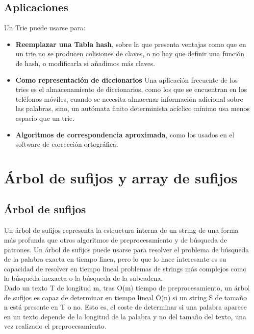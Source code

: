 \documentclass[es]{ifirak}
\begin{document}
\subsection{Aplicaciones}
\large{
Un Trie puede usarse para:

\begin{itemize}

	\item \textbf{Reemplazar una Tabla hash}, sobre la que presenta ventajas como que en un trie no se producen colisiones de claves, o no hay que definir una función de hash, o modificarla si añadimos más claves.
	\item \textbf{Como representación de diccionarios} Una aplicación frecuente de los tries es el almacenamiento de diccionarios, como los que se encuentran en los teléfonos móviles, cuando se necesita almacenar información adicional sobre las palabras, sino, un autómata finito determinista acíclico mínimo usa menos espacio que un trie.
	\item \textbf{Algoritmos de correspondencia aproximada}, como los usados en el software de corrección ortográfica.
\end{itemize}
}
\pagebreak
\section{Árbol de sufijos y array de sufijos}

\subsection{Árbol de sufijos}
\paragraph{}
Un árbol de sufijos representa la estructura interna de un string de una forma más profunda que otros algoritmos de preprocesamiento y de búsqueda de patrones. Un árbol de sufijos puede usarse para resolver el problema de búsqueda de la palabra exacta en tiempo linea, pero lo que lo hace interesante es su capacidad de resolver en tiempo lineal problemas de strings más complejos como la búsqueda inexacta o la búsqueda de la subcadena.\\

Dado un texto T de longitud m, tras O(m) tiempo de preprocesamiento, un árbol de sufijos es capaz de determinar en tiempo lineal O(n) si un string S de tamaño n está presente en T o no. Esto es, el coste de determinar si una palabra aparece en un texto depende de la longitud de la palabra y no del tamaño del texto, una vez realizado el preprocesamiento.
\end{document}
